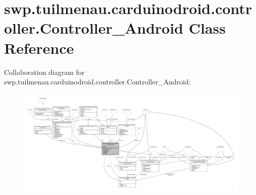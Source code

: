 \hypertarget{classswp_1_1tuilmenau_1_1carduinodroid_1_1controller_1_1_controller___android}{}\section{swp.\+tuilmenau.\+carduinodroid.\+controller.\+Controller\+\_\+\+Android Class Reference}
\label{classswp_1_1tuilmenau_1_1carduinodroid_1_1controller_1_1_controller___android}


Collaboration diagram for swp.\+tuilmenau.\+carduinodroid.\+controller.\+Controller\+\_\+\+Android\+:
\nopagebreak
\begin{figure}[H]
\begin{center}
\leavevmode
\includegraphics[width=350pt]{classswp_1_1tuilmenau_1_1carduinodroid_1_1controller_1_1_controller___android__coll__graph}
\end{center}
\end{figure}
